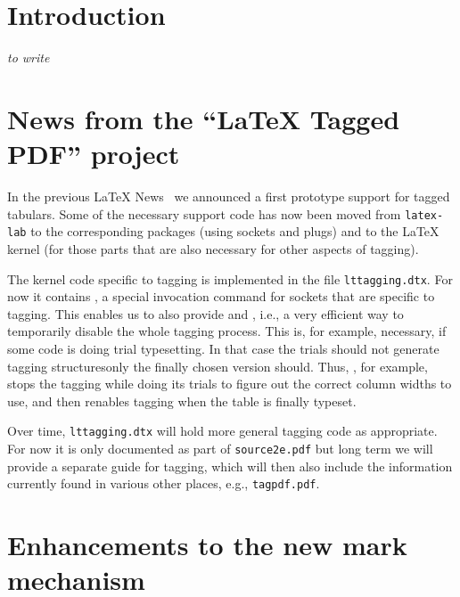 \documentclass{ltnews}
\providecommand\Dash {\unskip \textemdash}
\providecommand\tubcommand[1]{}
\begin{document}
\tubcommand{\addtolength\textheight{4.2pc}}   %

\maketitle
{  \spaceskip=3.33pt 
\tableofcontents}

\setlength{}

\medskip

\section{Introduction}

\emph{to write}


\section{News from the \enquote{\LaTeX{} Tagged PDF} project}

In the previous \LaTeX{} News~\cite{39:ltnews38} we announced a first prototype
support for tagged tabulars. Some of the necessary support code has
now been moved from \texttt{latex-lab} to the corresponding packages
(using sockets and plugs) and to the \LaTeX{} kernel (for those parts
that are also necessary for other aspects of tagging).

The kernel code specific to tagging is implemented in the file
\texttt{lttagging.dtx}.  For now it contains , a
special invocation command for sockets that are specific to
tagging. This enables us to also provide  and
, i.e., a very efficient way to temporarily disable
the whole tagging process. This is, for example, necessary, if some
code is doing trial typesetting. In that case the trials should not
generate tagging structures\Dash only the finally chosen version
should. Thus, , for example, stops the tagging while
doing its trials to figure out the correct column widths to use, and
then renables tagging when the table is finally typeset.

Over time, \texttt{lttagging.dtx} will hold more general tagging code
as appropriate. For now it is only documented as part of
\texttt{source2e.pdf} but long term we will provide a separate guide
for tagging, which will then also include the information currently
found in various other places, e.g., \texttt{tagpdf.pdf}.


\section{Enhancements to the new mark mechanism}
\end{document}
